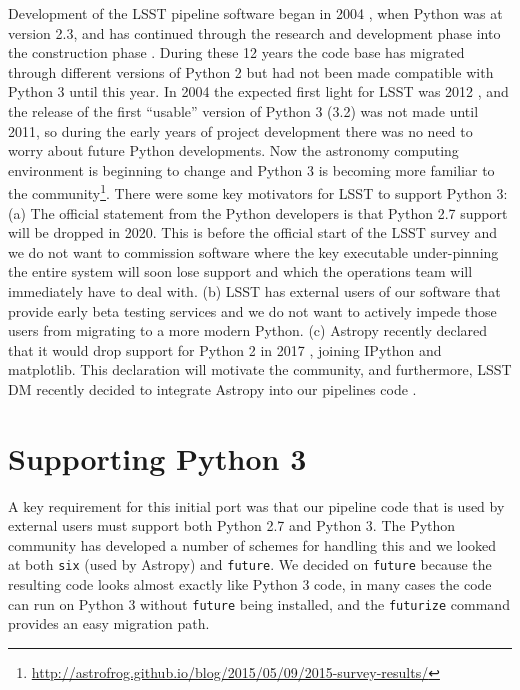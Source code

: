 \documentclass[11pt,twoside]{article}
\begin{document}
Development of the LSST pipeline software began in 2004 \citep{2004AAS...20510811A}, when Python was at version 2.3, and has continued through the research and development phase \citep{2010SPIE.7740E..15A} into the construction phase \citep{P056_adassxxv}.
During these 12 years the code base has migrated through different versions of Python 2 but had not been made compatible with Python 3 until this year.
In 2004 the expected first light for LSST was 2012 \citep{2004SPIE.5489..705C}, and the release of the first ``usable'' version of Python 3 (3.2) was not made until 2011, so during the early years of project development there was no need to worry about future Python developments.
Now the astronomy computing environment is beginning to change and Python 3 is becoming more familiar to the community\footnote{\url{http://astrofrog.github.io/blog/2015/05/09/2015-survey-results/}}.
There were some key motivators for LSST to support Python 3: (a) The official statement from the Python developers is that Python 2.7 support will be dropped in 2020.
This is before the official start of the LSST survey and we do not want to commission software where the key executable under-pinning the entire system will soon lose support and which the operations team will immediately have to deal with.
(b) LSST has external users of our software that provide early beta testing services and we do not want to actively impede those users from migrating to a more modern Python.
(c) Astropy \citep{2013A&A...558A..33A} recently declared that it would drop support for Python 2 in 2017 \citep{APE10}, joining IPython and matplotlib. This declaration will motivate the community, and furthermore, LSST DM recently decided to integrate Astropy into our pipelines code \citep{doi:10.1117/12.2231313}.

\section{Supporting Python 3}

A key requirement for this initial port was that our pipeline code that is used by external users must support both Python 2.7 and Python 3.
The Python community has developed a number of schemes for handling this and we looked at both \texttt{six} (used by Astropy) and \texttt{future}.
We decided on \texttt{future} because the resulting code looks almost exactly like Python 3 code, in many cases the code can run on Python 3 without \texttt{future} being installed, and the \texttt{futurize} command provides an easy migration path.
\end{document}
